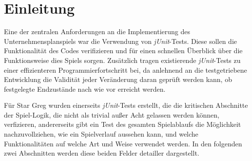 \section{Einleitung}
\label{sec:junit-einleitung}

\newcommand{\junit}{\textit{jUnit}}

Eine der zentralen Anforderungen an die Implementierung des Unternehmensplanspiels war die Verwendung von \junit-Tests. Diese sollen die Funktionalität des Codes verifizieren und für einen schnellen Überblick über die Funktionsweise dies Spiels sorgen. Zusätzlich tragen existierende \junit-Tests zu einer effizienteren Programmierfortschritt bei, da anlehnend an die testgetriebene Entwicklung die Validität jeder Veränderung daran geprüft werden kann, ob festgelegte Endzustände nach wie vor erreicht werden.

Für Star Greg wurden einerseits \junit-Tests erstellt, die die kritischen Abschnitte der Spiel-Logik, die nicht als trivial außer Acht gelassen werden können, verfizieren, andererseits gibt ein Test des gesamten Spielablaufs die Möglichkeit nachzuvollziehen, wie ein Spielverlauf aussehen kann, und welche Funktionalitäten auf welche Art und Weise verwendet werden. In den folgenden zwei Abschnitten werden diese beiden Felder detailler dargestellt.